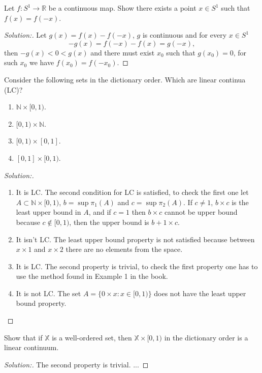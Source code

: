 \documentclass[a4paper,12pt, reqno]{article}
\theoremstyle{definition}
\newenvironment{exerr}[1]{
  \renewcommand\theexeralt{#1}
  \exeralt
}{\endexeralt}
\newenvironment{solution}{\begin{proof}[Solution:]}{\end{proof}}
\newcommand{\R}{\mathbb{R}}
\newcommand{\N}{\mathbb{N}}
\newcommand{\X}{\mathbb{X}}
\begin{document}
\begin{exerr}{2}
  Let $f:S^1\to\R$ be a continuous map. Show there exists a point $x\in S^1$ such that $f(x) = f(-x)$.
\end{exerr}
\begin{solution}
  Let $g(x) = f(x) - f(-x)$, $g$ is continuous and for every $x\in S^1$
  \begin{equation*}
      -g(x) = f(-x) - f(x) = g(-x),
  \end{equation*}
  then $-g(x)<0<g(x)$ and there must exist $x_{0}$ such that $g(x_{0}) = 0$, for such $x_{0}$ we have $f(x_{0}) = f(-x_{0})$.
\end{solution}

\begin{exerr}{5}
  Consider the following sets in the dictionary order. Which are linear continua (LC)?
  \begin{enumerate}[label=(\alph*)]
    \item $\N\times[0,1)$.
    \item $[0,1)\times\N$.
    \item $[0,1)\times[0,1]$.
    \item $[0,1]\times[0,1)$.
  \end{enumerate}
\end{exerr}
\begin{solution}\hfil
  \begin{enumerate}[label=(\alph*)]
    \item It is LC. The second condition for LC is satisfied, to check the first one let $A\subset\N\times[0,1)$, $b = \sup\pi_{1}(A)$ and $c = \sup\pi_{2}(A)$.  If $c\neq1$, $b\times c$ is the least upper bound in $A$, and if $c=1$ then $b\times c$ cannot be upper bound because $c\notin[0,1)$, then the upper bound is $b+1\times c$.
    \item It isn't LC. The least upper bound property is not satisfied because between $x\times1$ and $x\times2$ there are no elements from the space.
    \item It is LC. The second property is trivial, to check the first property one has to use the method found in Example 1 in the book.
    \item It is not LC. The set $A = \{ 0\times x: x\in[0,1) \}$ does not have the least upper bound property.
  \end{enumerate}
\end{solution}

\begin{exerr}{6}
  Show that if $\X$ is a well-ordered set, then $\X\times[0,1)$ in the dictionary order is a linear continuum.
\end{exerr}
\begin{solution}
  The second property is trivial. ...
\end{solution}
\end{document}
